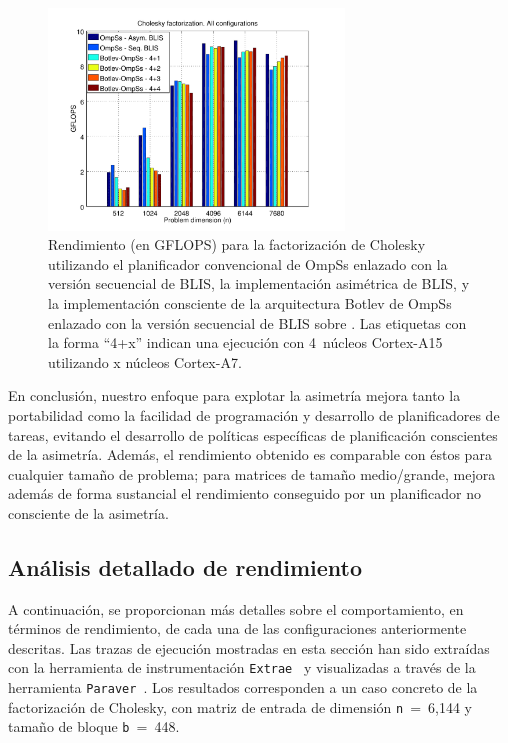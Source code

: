 \begin{figure}
\centering
\includegraphics[width=0.70\textwidth]{Plots/Comparative/comparative}
	\caption[Rendimiento (en GFLOPS) para la factorización de Cholesky utilizando distintas implementaciones.]{Rendimiento (en GFLOPS) para la factorización de Cholesky utilizando 
el planificador convencional de OmpSs enlazado con la versión secuencial de BLIS, la implementación asimétrica de BLIS, y 
la implementación consciente de la arquitectura Botlev de OmpSs enlazado con la versión secuencial de BLIS sobre \odroid. 
Las etiquetas con la forma ``4+x'' indican una ejecución con 4~núcleos Cortex-A15 utilizando x núcleos Cortex-A7.}
\label{fig:comparative}
\end{figure}

En conclusión, nuestro enfoque para explotar la asimetría mejora tanto la portabilidad como la facilidad de
programación y desarrollo de planificadores de tareas, evitando el desarrollo de políticas específicas de planificación
conscientes de la asimetría. Además, el rendimiento obtenido es comparable con éstos para cualquier tamaño de problema; para
matrices de tamaño medio/grande, mejora además de forma sustancial el rendimiento conseguido por un planificador no consciente de la
asimetría.

\subsection{Análisis detallado de rendimiento}

A continuación, se proporcionan más detalles sobre el comportamiento, en términos de rendimiento, de cada una de las 
configuraciones anteriormente descritas. Las trazas de ejecución mostradas en esta sección han sido extraídas con la
herramienta de instrumentación {\tt Extrae}~\cite{Extrae} y visualizadas a través de la herramienta {\tt Paraver}~\cite{Paraver}.
Los resultados corresponden a un caso concreto de la factorización de Cholesky, con matriz de entrada de dimensión
{\tt n}~=~6,144 y tamaño de bloque {\tt b}~=~448.

